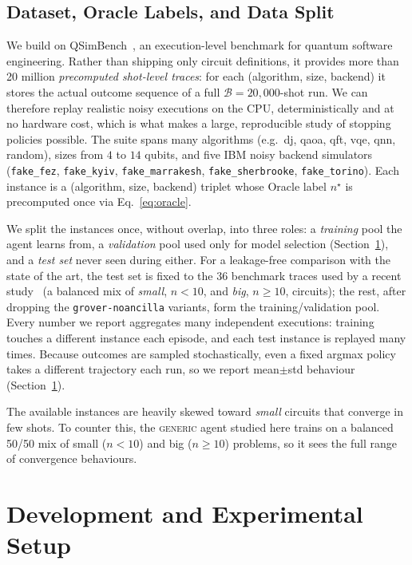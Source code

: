 \documentclass[runningheads]{llncs}
\begin{document}
\subsection{Dataset, Oracle Labels, and Data Split}
\label{sec:dataset}

We build on QSimBench~\cite{qsimbench}, an execution-level benchmark for quantum
software engineering. Rather than shipping only circuit definitions, it provides
more than 20 million \emph{precomputed shot-level traces}: for each (algorithm,
size, backend) it stores the actual outcome sequence of a full
$\mathcal{B}=20{,}000$-shot run. We can therefore replay realistic noisy
executions on the CPU, deterministically and at no hardware cost, which is what
makes a large, reproducible study of stopping policies possible. The suite spans
many algorithms (e.g.\ dj, qaoa, qft, vqe, qnn, random), sizes from $4$ to $14$
qubits, and five IBM noisy backend simulators (\texttt{fake\_fez},
\texttt{fake\_kyiv}, \texttt{fake\_marrakesh}, \texttt{fake\_sherbrooke},
\texttt{fake\_torino}). Each instance is a (algorithm, size, backend) triplet
whose Oracle label $n^{\star}$ is precomputed once via Eq.~\eqref{eq:oracle}.

We split the instances once, without overlap, into three roles: a \emph{training}
pool the agent learns from, a \emph{validation} pool used only for model selection
(Section~\ref{sec:setup}), and a \emph{test set} never seen during either. For a
leakage-free comparison with the state of the art, the test set is fixed to the
$36$ benchmark traces used by a recent study~\cite{bisicchia2026shots} (a balanced
mix of \emph{small}, $n<10$, and \emph{big}, $n\ge10$, circuits); the rest, after
dropping the \texttt{grover-noancilla} variants, form the training/validation
pool. Every number we report aggregates many independent executions: training
touches a different instance each episode, and each test instance is replayed many
times. Because outcomes are sampled stochastically, even a fixed argmax policy
takes a different trajectory each run, so we report mean$\pm$std behaviour
(Section~\ref{sec:setup}).

The available instances are heavily skewed toward \emph{small} circuits that
converge in few shots. To counter this, the \textsc{generic} agent studied here
trains on a balanced 50/50 mix of small ($n<10$) and big ($n\ge10$) problems, so
it sees the full range of convergence behaviours.

\section{Development and Experimental Setup}
\label{sec:setup}
\end{document}
